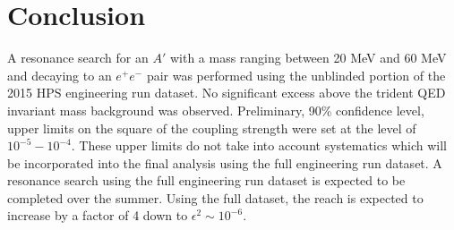 
\chapter{Conclusion}

A resonance search for an $A'$ with a mass ranging between 20 MeV and 60
MeV and decaying to an $e^+e^-$ pair was performed using the unblinded
portion of the 2015 HPS engineering run dataset. No significant excess above the 
trident QED invariant mass background was observed.  Preliminary, 90\% confidence level,
upper limits on the square of the coupling strength were set at the level of $10^{-5} - 10^{-4}$. 
These upper limits
do not take into account systematics which will be incorporated into the final 
analysis using the full engineering run dataset.  A resonance search using the 
full engineering run dataset is expected to be completed over the summer. 
Using the full dataset, the reach is expected to increase by a factor of 
4 down to $\epsilon^2 \sim 10^{-6}$.



